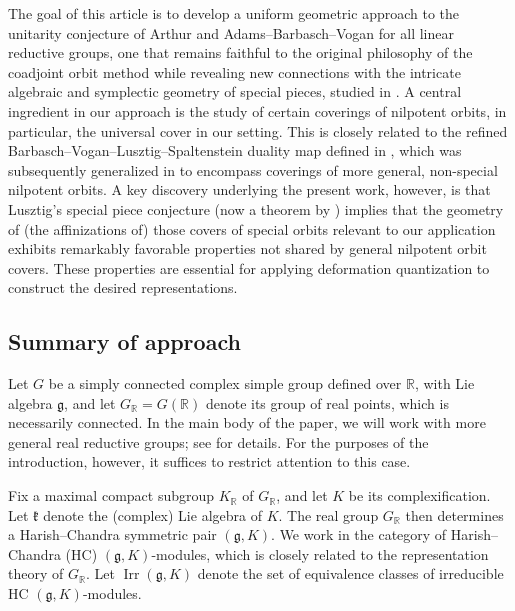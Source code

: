 \documentclass[11pt, a4paper]{amsart}
\newcommand{\fg}{\mathfrak{g}}
\newcommand{\fk}{\mathfrak{k}}
\newcommand{\R}{\mathbb{R}}
\newcommand{\GR}{G_\R}
\newcommand{\KR}{K_\R}
\newcommand{\Irr}{\operatorname{Irr}}
\theoremstyle{definition}
\numberwithin{equation}{section}
\begin{document}
The goal of this article is to develop a uniform geometric approach to the unitarity conjecture of Arthur and Adams--Barbasch--Vogan for all linear reductive groups, one that remains faithful to the original philosophy of the coadjoint orbit method while revealing new connections with the intricate algebraic and symplectic geometry of special pieces, studied in \cite{Spaltenstein,Lusztig:unipotent}.
A central ingredient in our approach is the study of certain coverings of nilpotent orbits, in particular, the universal cover in our setting. This is closely related to the refined Barbasch--Vogan--Lusztig--Spaltenstein duality map defined in \cite{LMBM}, which was subsequently generalized in \cite{MBMY} to encompass coverings of more general, non-special nilpotent orbits. 
A key discovery underlying the present work, however, is that Lusztig’s special piece conjecture \cite{Lusztig:unipotent} (now a theorem by \cite{Kraft-Procesi:special,JLSY:SpecialPiece}) implies that the geometry of (the affinizations of) those covers of special orbits relevant to our application exhibits remarkably favorable properties not shared by general nilpotent orbit covers. These properties are essential for applying deformation quantization to construct the desired representations. 

\subsection{Summary of approach} \label{subsec:approach}

Let $G$ be a simply connected complex simple group defined over $\R$, with Lie algebra $\fg$, and let $\GR = G(\R)$ denote its group of real points, which is necessarily connected. In the main body of the paper, we will work with more general real reductive groups; see  for details. For the purposes of the introduction, however, it suffices to restrict attention to this case.

Fix a maximal compact subgroup $\KR$ of $\GR$, and let $K$ be its complexification. Let $\fk$ denote the (complex) Lie algebra of $K$. The real group $\GR$ then determines a Harish--Chandra symmetric pair $(\fg, K)$. We work in the category of Harish--Chandra (HC) $(\fg, K)$-modules, which is closely related to the representation theory of $\GR$. Let $\Irr(\fg, K)$ denote the set of equivalence classes of irreducible HC $(\fg, K)$-modules.
\end{document}
